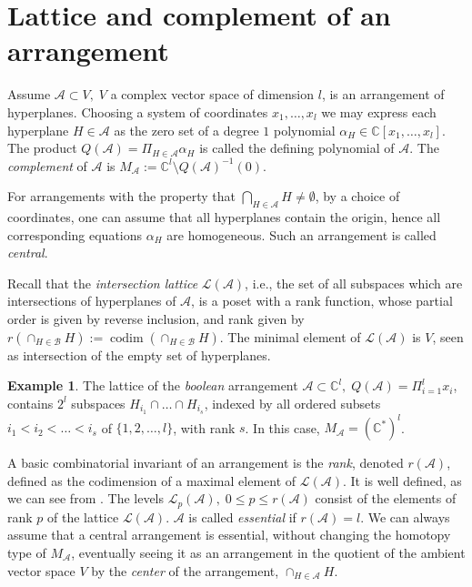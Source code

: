 \documentclass[psamsfonts]{conm-p-l}
\theoremstyle{definition}
\newtheorem{example}[theorem]{Example}
\theoremstyle{remark}
\numberwithin{equation}{section}
\newcommand{\A}{{\mathcal A}}
\newcommand{\B}{{\mathcal B}}
\newcommand{\C}{\mathbb{C}}
\DeclareMathOperator{\codim}{codim}
\begin{document}
\section{Lattice and complement of an arrangement}
\label{sect:lattice}

Assume $\A \subset V,\;V$ a complex vector space of dimension $l$, is an arrangement of hyperplanes.
Choosing a system of coordinates $x_1, \dots, x_l$ we may  express each hyperplane 
$H \in \A$ as the zero set of a degree $1$ polynomial $\alpha_H \in \C[x_1, \dots, x_l]$. 
The product $Q(\A)=\Pi_{H \in \A}\alpha_H$ is called the defining polynomial of $\A$. The
{\em complement} of $\A$ is $M_{\A} := \C^l \setminus Q(\A)^{-1}(0)$. 

 For arrangements with the property that $\bigcap_{H \in \A}H \neq \emptyset$, by a choice of 
 coordinates, one can assume that all hyperplanes contain the origin, hence all 
 corresponding equations $\alpha_H$ are homogeneous. Such an arrangement is called {\it central}.
 
Recall that the {\em intersection lattice} $\mathcal L(\A)$, i.e., the set of all subspaces 
which are intersections of hyperplanes 
of $\A$, is a poset with a rank function, whose partial order is
given by reverse inclusion, and rank given by $r(\cap_{H\in \B} H) := \codim (\cap_{H\in \B} H)$. 
The minimal element of $\mathcal L(\A)$ is $V$, seen as intersection 
of the empty set of hyperplanes.
%
\begin{example}
\label{latice}
The lattice of the {\it boolean} arrangement $\A \subset \C^l,\; Q(\A)=\Pi_{i=1}^l x_i$, contains 
$2^l$ subspaces $H_{i_1} \cap \dots \cap H_{i_s}$, indexed by all ordered subsets 
$i_1 < i_2< \dots <i_s$ of $\{1, 2, \dots, l\}$, with rank $s$. In this case, $M_{\A}= (\C^*)^l$.
\end{example}
 
A basic combinatorial invariant of an arrangement is the {\it rank}, denoted $r(\A)$, defined as 
the codimension of a maximal element of $\mathcal L(\A)$. It is  well defined, as we can see from \cite[Lemma 2.4]{OT}.  
The levels $\mathcal L_p(\A), \;0 \leq p \leq r(\A)$ consist of the elements of rank $p$
of the lattice $\mathcal L(\A)$. $\A$ is called {\it essential} if $r(\A)=l$. We can always assume 
that a central arrangement
is essential, without changing the homotopy type of $M_{\A}$, eventually seeing it 
as an arrangement in the quotient of the ambient
vector space $V$ by the {\em center} of the arrangement, $\cap_{H\in \A} H$.
\end{document}
